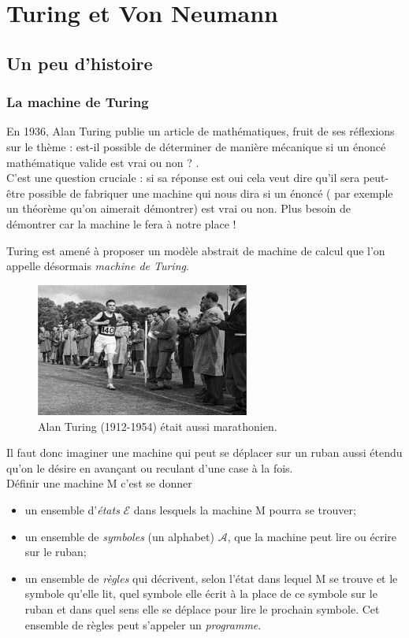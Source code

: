 \chapter{Turing et Von Neumann}

\section{Un peu d'histoire}
\subsection{La machine de Turing}

En 1936, Alan Turing publie un article de mathématiques, fruit de ses réflexions sur le thème : \og est-il possible de déterminer de manière
mécanique si un énoncé mathématique valide est vrai ou non ? \fg{}.\\
C'est une question cruciale : si sa réponse est \og oui\fg{} cela veut dire qu'il sera peut-être possible de fabriquer une machine qui nous dira si
un énoncé ( par exemple un théorème qu'on aimerait démontrer) est vrai ou non. Plus besoin de démontrer car la machine le fera à notre place !

Turing est amené à proposer un modèle abstrait de machine de calcul que l'on appelle désormais \textit{machine de Turing}.

\begin{figure}[H]
\begin{center}
\includegraphics[width=7cm]{ch-turing/img/turing}
\end{center}
\caption*{Alan Turing (1912-1954) était aussi marathonien.}
\end{figure}

Il faut donc imaginer une machine qui peut se déplacer sur un ruban aussi étendu qu'on le désire en avançant ou reculant d'une case à la fois.\\
Définir une machine M c'est se donner
\begin{itemize}
    \item 	un ensemble d'\textit{états} $\mathcal{E}$ dans lesquels la machine M pourra se trouver;
    \item 	un ensemble de \textit{symboles} (un alphabet) $\mathcal{A}$, que la machine peut lire ou écrire sur le ruban;
    \item 	un ensemble de \textit{règles} qui décrivent, selon l'état dans lequel M se trouve et le symbole qu'elle lit, quel symbole elle écrit à
          la place de ce symbole sur le ruban et dans quel sens elle se déplace pour lire le prochain symbole. Cet ensemble de règles peut s'appeler un
          \textit{programme}.
\end{itemize}

